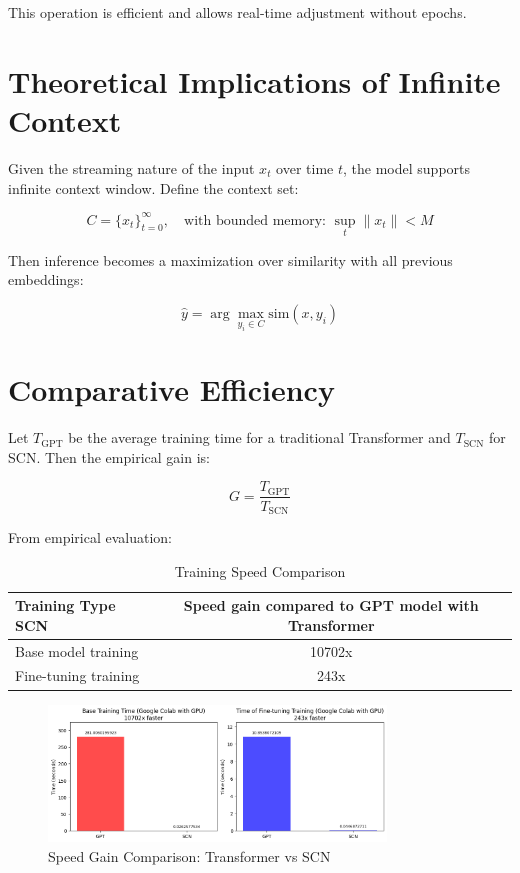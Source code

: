 \documentclass[11pt]{article}
\begin{document}
This operation is efficient and allows real-time adjustment without epochs.

\section{Theoretical Implications of Infinite Context}
Given the streaming nature of the input $x_t$ over time $t$, the model supports infinite context window. Define the context set:

\begin{equation}
C = \{ x_t \}_{t=0}^{\infty}, \quad \text{with bounded memory: } \sup_t \|x_t\| < M
\end{equation}

Then inference becomes a maximization over similarity with all previous embeddings:

\begin{equation}
\hat{y} = \arg\max_{y_i \in C} \text{sim}(x, y_i)
\end{equation}

\section{Comparative Efficiency}
Let $T_{\text{GPT}}$ be the average training time for a traditional Transformer and $T_{\text{SCN}}$ for SCN. Then the empirical gain is:

\begin{equation}
G = \frac{T_{\text{GPT}}}{T_{\text{SCN}}}
\end{equation}

From empirical evaluation:
\begin{table}[H]
\centering
\caption{Training Speed Comparison}
\begin{tabular}{|l|c|}
\hline
\textbf{Training Type SCN} & \textbf{Speed gain compared to GPT model with Transformer} \\
\hline
Base model training & 10702x \\
Fine-tuning training & 243x \\
\hline
\end{tabular}
\end{table}

\begin{figure}[H]
    \centering
    \includegraphics[width=0.8\textwidth]{gpt_vs_scn.png}
    \caption{Speed Gain Comparison: Transformer vs SCN}
\end{figure}
\end{document}
